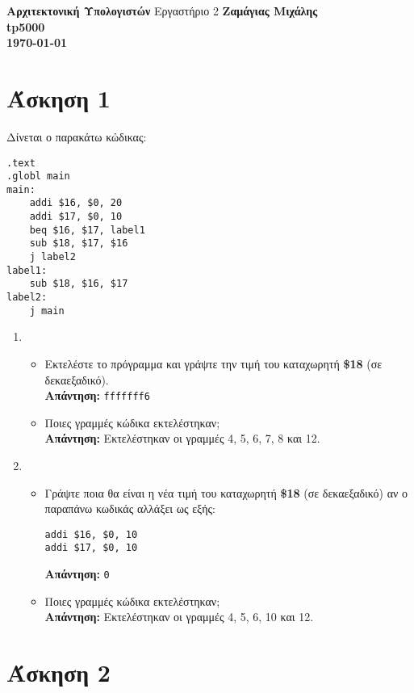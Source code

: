 \documentclass[a4paper,12pt]{article}
\begin{document}
\begin{titlepage}
    \begin{center}
        \vspace*{\fill}
        \huge{\textbf{Αρχιτεκτονική Υπολογιστών}}
        \vfill
        Εργαστήριο 2
        \vfill
        \vspace*{\fill}
        \vfill
        \normalsize\textbf{Ζαμάγιας Μιχάλης\\tp5000\\}
        \small\textbf{\today}
        \vfill
    \end{center}
\end{titlepage}



\section{Άσκηση 1}

Δίνεται ο παρακάτω κώδικας:
\begin{lstlisting}
.text
.globl main
main:
    addi $16, $0, 20
    addi $17, $0, 10
    beq $16, $17, label1
    sub $18, $17, $16
    j label2
label1:
    sub $18, $16, $17
label2:
    j main
\end{lstlisting}

\begin{enumerate}
    \item \begin{itemize}
              \item Εκτελέστε το πρόγραμμα και γράψτε την τιμή του
                    καταχωρητή \textbf{\$18} (σε δεκαεξαδικό).\\
                    \textbf{Απάντηση:} \texttt{fffffff6}
              \item Ποιες γραμμές κώδικα εκτελέστηκαν;\\
                    \textbf{Απάντηση:} Eκτελέστηκαν οι γραμμές 4, 5, 6, 7, 8 και 12.
          \end{itemize}
    \item \begin{itemize}
              \item Γράψτε ποια θα είναι η νέα τιμή του καταχωρητή \textbf{\$18} (σε δεκαεξαδικό) αν ο παραπάνω κωδικάς αλλάξει ως εξής:
                    \begin{lstlisting}[firstnumber=4]
addi $16, $0, 10
addi $17, $0, 10
\end{lstlisting}
                    \textbf{Απάντηση:} \texttt{0}
              \item Ποιες γραμμές κώδικα εκτελέστηκαν;\\
                    \textbf{Απάντηση:} Eκτελέστηκαν οι γραμμές 4, 5, 6, 10 και 12.
          \end{itemize}
\end{enumerate}

\newpage
\section{Άσκηση 2}
\end{document}

